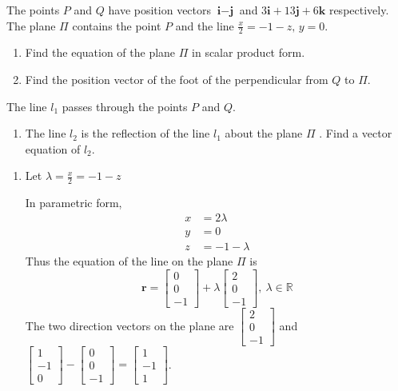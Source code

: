 \documentclass[11pt,a4paper]{book}
\newcommand{\R}{\mathbb{R}}
\begin{document}
\begin{example}

The points $P$ and $Q$ have position vectors $\textbf{i}-\textbf{j}$
and $3\textbf{i}+13\textbf{j}+6\textbf{k}$ respectively. The plane
$\Pi$ contains the point $P$ and the line ${\displaystyle \frac{x}{2}=-1-z,\,y=0}$.

\begin{enumerate}[label=(\alph*)]

\item  Find the equation of the plane $\Pi$ in scalar product form.

\item  Find the position vector of the foot of the perpendicular
from $Q$ to $\Pi$.

\end{enumerate}

The line $l_{1}$ passes through the points $P$ and $Q$.

\begin{enumerate}[label=(\alph*),start=3]

\item The line $l_{2}$ is the reflection of the line $l_{1}$ about
the plane $\Pi$ . Find a vector equation of $l_{2}$.

\end{enumerate}

\Solution

\begin{enumerate}[label=(\alph*)]

\item  Let ${\displaystyle \lambda=\frac{x}{2}=-1-z}$

In parametric form,
\begin{align*}
x & =2\lambda\\
y & =0\\
z & =-1-\lambda
\end{align*}
Thus the equation of the line on the plane $\Pi$ is
\[
\textbf{r}=\begin{bmatrix}0\\
0\\
-1
\end{bmatrix}+\lambda\begin{bmatrix}2\\
0\\
-1
\end{bmatrix},\:\lambda\in\R
\]
The two direction vectors on the plane are $\begin{bmatrix}2\\
0\\
-1
\end{bmatrix}$ and $\begin{bmatrix}1\\
-1\\
0
\end{bmatrix}-\begin{bmatrix}0\\
0\\
-1
\end{bmatrix}=\begin{bmatrix}1\\
-1\\
1
\end{bmatrix}$.


\end{enumerate}
\end{example}
\end{document}
